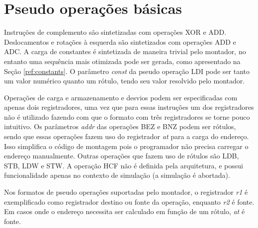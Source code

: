 \documentclass{extreport}
\begin{document}
\section{Pseudo operações básicas}

Instruções de complemento são sintetizadas com operações XOR e ADD. Deslocamentos e rotações à esquerda são sintetizados com operações ADD e ADC. A carga de constantes é sintetizada de maneira trivial pelo montador, no entanto uma sequência mais otimizada pode ser gerada, como apresentado na Seção \ref{ref:constants}. O parâmetro \textit{const} da pseudo operação LDI pode ser tanto um valor numérico quanto um rótulo, tendo seu valor resolvido pelo montador.

Operações de carga e armazenamento e desvios podem ser especificadas com apenas dois registradores, uma vez que para essas instruções um dos registradores não é utilizado fazendo com que o formato com três registradores se torne pouco intuitivo. Os parâmetros \textit{addr} das operações BEZ e BNZ podem ser rótulos, sendo que essas operações fazem uso do registrador \textit{at} para a carga do endereço. Isso simplifica o código de montagem pois o programador não precisa carregar o endereço manualmente. Outras operações que fazem uso de rótulos são LDB, STB, LDW e STW. A operação HCF não é definida pela arquitetura, e possui funcionalidade apenas no contexto de simulação (a simulação é abortada).

Nos formatos de pseudo operações suportadas pelo montador, o registrador \textit{r1} é exemplificado como registrador destino ou fonte da operação, enquanto \textit{r2} é fonte. Em casos onde o endereço necessita ser calculado em função de um rótulo, \textit{at} é fonte.
\end{document}
